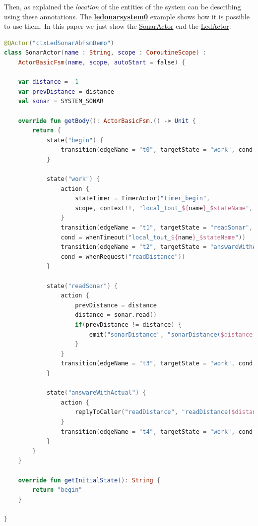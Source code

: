 Then, as explained the \textit{location} of the entities of the system can be describing using these annotations. The \href{https://github.com/LM-96/QA-Extensions/tree/main/it.unibo.ledsonardemo0}{\textcolor{Emerald}{\textbf{ledonarsystem0}}} example shows how it is possible to use them.
In this paper we just show the \href{https://github.com/LM-96/QA-Extensions/blob/main/it.unibo.ledsonardemo0/src/main/kotlin/it/unibo/ledsonardemo0/actors/SonarActor.kt}{SonarActor} end the \href{https://github.com/LM-96/QA-Extensions/blob/main/it.unibo.ledsonardemo0/src/main/kotlin/it/unibo/ledsonardemo0/actors/LedActor.kt}{LedActor}:

\begin{lstlisting}[caption=\texttt{SonarActor} (\texttt{ledsonarsystem0}),language=Kotlin]
@QActor("ctxLedSonarAbFsmDemo")
class SonarActor(name : String, scope : CoroutineScope) :
	ActorBasicFsm(name, scope, autoStart = false) {
	
	var distance = -1
	var prevDistance = distance
	val sonar = SYSTEM_SONAR
	
	override fun getBody(): ActorBasicFsm.() -> Unit {
		return {
			state("begin") {
				transition(edgeName = "t0", targetState = "work", cond = doswitch())
			}
			
			state("work") {
				action {
					stateTimer = TimerActor("timer_begin",
					scope, context!!, "local_tout_${name}_$stateName", 2000 )
				}
				transition(edgeName = "t1", targetState = "readSonar",
				cond = whenTimeout("local_tout_${name}_$stateName"))
				transition(edgeName = "t2", targetState = "answareWithActual",
				cond = whenRequest("readDistance"))
			}
			
			state("readSonar") {
				action {
					prevDistance = distance
					distance = sonar.read()
					if(prevDistance != distance) {
						emit("sonarDistance", "sonarDistance($distance)")
					}
				}
				transition(edgeName = "t3", targetState = "work", cond = doswitch())
			}
			
			state("answareWithActual") {
				action {
					replyToCaller("readDistance", "readDistance($distance)")
				}
				transition(edgeName = "t4", targetState = "work", cond = doswitch())
			}
		}
	}
	
	override fun getInitialState(): String {
		return "begin"
	}
	
}
\end{lstlisting}

